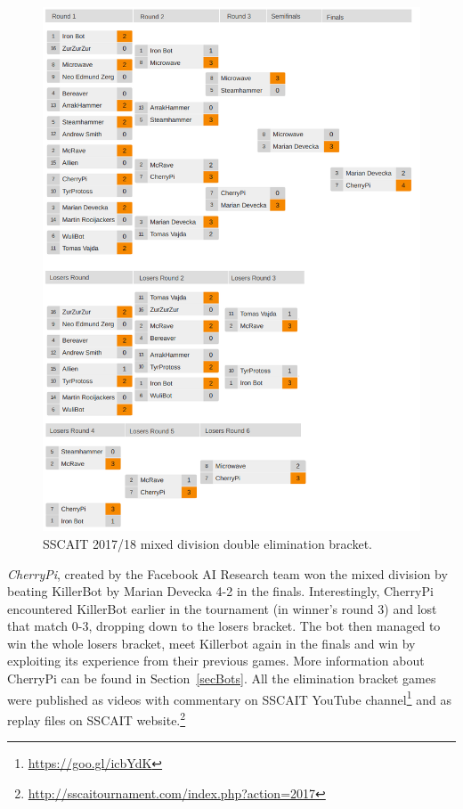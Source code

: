 \begin{figure}[t] 
  \centering
  \includegraphics[width=1.04\columnwidth]{fig/sscait-bracket.png}
  \caption{SSCAIT 2017/18 mixed division double elimination bracket.}
  \label{figSSCAITbracket}
\end{figure}  

{\em CherryPi}, created by the Facebook AI Research team won the mixed division by beating KillerBot by Marian Devecka 4-2 in the finals. Interestingly, CherryPi encountered KillerBot earlier in the tournament (in winner's round 3) and lost that match 0-3, dropping down to the losers bracket. The bot then managed to win the whole losers bracket, meet Killerbot again in the finals and win by exploiting its experience from their previous games. More information about CherryPi can be found in Section~\ref{secBots}.
All the elimination bracket games were published as videos with commentary on SSCAIT YouTube channel\footnote{\url{https://goo.gl/icbYdK}} and as replay files on SSCAIT website.\footnote{\url{http://sscaitournament.com/index.php?action=2017}} 




